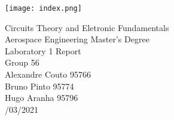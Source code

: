 
\thispagestyle {empty}

\texttt{[image: index.png]}

\begin{center}
%
\vspace{3.0cm}

\vspace{1cm}
{\FontLb Circuits Theory and Eletronic Fundamentals} \\ %
\vspace{1cm}
{\FontSn Aerospace Engineering Master's Degree} \\ %
\vspace{1cm}
{\FontSn Laboratory 1 Report } \\
\vspace{1cm}
{\FontSn Group 56 } \\
\vspace{1cm}
{\FontSn Alexandre Couto 95766} \\
\vspace{0.1cm}
{\FontSn Bruno Pinto     95774} \\
\vspace{0.1cm}
{\FontSn Hugo Aranha     95796} \\
\vspace{0.5cm}
{/03/2021} \\ %
%
\end{center}

